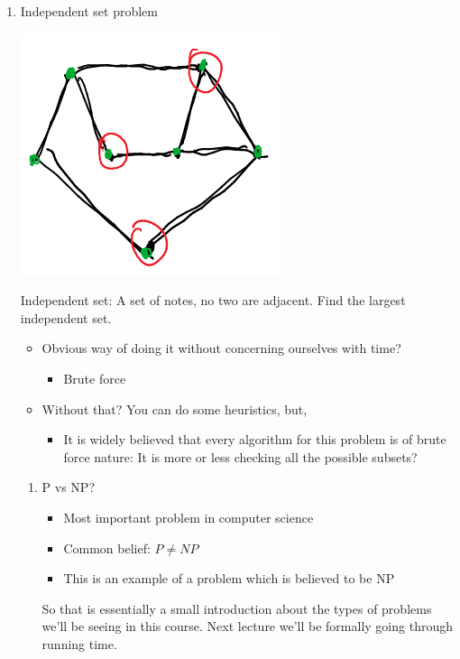 \documentclass[11pt]{article}
\begin{document}
\begin{enumerate}
\item Independent set problem
\label{sec:org0471adc}
\begin{center}
\includegraphics[width=.9\linewidth]{./Images/i3.png}
\end{center}
Independent set: A set of notes, no two are adjacent.
Find the largest independent set.
\begin{itemize}
\item Obvious way of doing it without concerning ourselves with time?
\begin{itemize}
\item Brute force
\end{itemize}
\item Without that? You can do some heuristics, but,
\begin{itemize}
\item It is widely believed that every algorithm for this problem is of brute force nature: It is more or less checking all the possible subsets?
\end{itemize}
\end{itemize}
\begin{enumerate}
\item P vs NP?
\label{sec:org4c482d4}
\begin{itemize}
\item Most important problem in computer science
\item Common belief: \(P\neq NP\)
\item This is an example of a problem which is believed to be NP
\end{itemize}

So that is essentially a small introduction about the types of problems we'll be seeing in this course. Next lecture we'll be formally going through running time.
\end{enumerate}
\end{enumerate}
\end{document}
